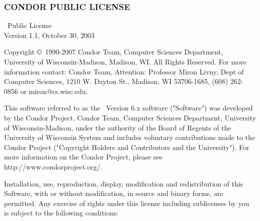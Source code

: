 \subsubsection*{\label{sec:condor-public-license}CONDOR PUBLIC LICENSE}

\begin{flushleft}
\CondorR\ Public License \\
Version 1.1, October 30, 2003
\end{flushleft}

Copyright \copyright\ 1990-2007 Condor Team, Computer Sciences Department,
University of Wisconsin-Madison, Madison, WI. All Rights Reserved.  For
more information contact: Condor Team, Attention: Professor Miron Livny,
Dept of Computer Sciences, 1210 W. Dayton St., Madison, WI 53706-1685, (608)
262-0856 or miron@cs.wisc.edu. 

This software referred to as the \CondorR\ Version 6.x software
("Software") was developed by the Condor Project, Condor Team,
Computer Sciences Department, University of Wisconsin-Madison, under
the authority of the Board of Regents of the  University of Wisconsin
System and includes voluntary contributions made to the Condor Project
("Copyright Holders and Contributors and the University").  For more
information on the Condor Project, please see
http://www.condorproject.org/.

Installation, use, reproduction, display, modification and
redistribution of this Software, with or without modification,  in
source and binary forms, are permitted.  Any exercise of rights under
this license including sublicenses by you is subject to the following
conditions:

